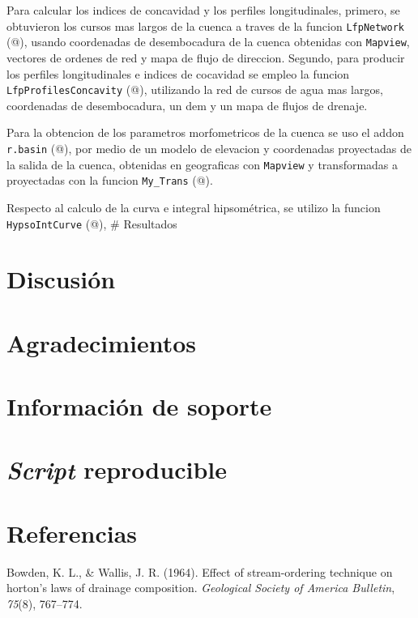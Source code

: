 \documentclass[11pt,]{article}
\begin{document}
Para calcular los indices de concavidad y los perfiles longitudinales,
primero, se obtuvieron los cursos mas largos de la cuenca a traves de la
funcion \texttt{LfpNetwork} (@), usando coordenadas de desembocadura de
la cuenca obtenidas con \texttt{Mapview}, vectores de ordenes de red y
mapa de flujo de direccion. Segundo, para producir los perfiles
longitudinales e indices de cocavidad se empleo la funcion
\texttt{LfpProfilesConcavity} (@), utilizando la red de cursos de agua
mas largos, coordenadas de desembocadura, un dem y un mapa de flujos de
drenaje.

Para la obtencion de los parametros morfometricos de la cuenca se uso el
addon \texttt{r.basin} (@), por medio de un modelo de elevacion y
coordenadas proyectadas de la salida de la cuenca, obtenidas en
geograficas con \texttt{Mapview} y transformadas a proyectadas con la
funcion \texttt{My\_Trans} (@).

Respecto al calculo de la curva e integral hipsométrica, se utilizo la
funcion \texttt{HypsoIntCurve} (@), \# Resultados

\section{Discusión}\label{discusiuxf3n}

\section{Agradecimientos}\label{agradecimientos}

\section{Información de soporte}\label{informaciuxf3n-de-soporte}

\section{\texorpdfstring{\emph{Script}
reproducible}{Script reproducible}}\label{script-reproducible}

\section*{Referencias}\label{referencias}

\hypertarget{refs}{}
\hypertarget{ref-bowden1964effect}{}
Bowden, K. L., \& Wallis, J. R. (1964). Effect of stream-ordering
technique on horton's laws of drainage composition. \emph{Geological
Society of America Bulletin}, \emph{75}(8), 767--774.
\end{document}
